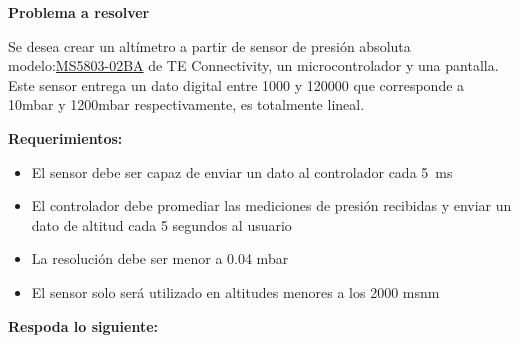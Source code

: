 \documentclass[12pt]{article}
\begin{document}
\setlength{\parindent}{0em}

\noindent\textbf{Problema a resolver}

\vspace{0.5cm}
Se desea crear un altímetro a partir de sensor de presión absoluta modelo:\href{https://www.te.com/commerce/DocumentDelivery/DDEController?Action=srchrtrv&DocNm=MS5803-02BA&DocType=Data+Sheet&DocLang=English}{MS5803-02BA} de TE Connectivity, un microcontrolador y una pantalla. Este sensor entrega un dato digital entre 1000 y 120000 que corresponde a 10mbar y 1200mbar respectivamente, es totalmente lineal. 

\vspace{0.5cm}
\noindent\textbf{Requerimientos:}
\begin{itemize}
    \item El sensor debe ser capaz de enviar un dato al controlador cada \SI{5}{\milli\second}
    \item El controlador debe promediar las mediciones de presión recibidas y enviar un dato de altitud cada 5 segundos al usuario
    \item La resolución debe ser menor a 0.04 \si{\milli bar}
    \item El sensor solo será utilizado en altitudes menores a los 2000 msnm
\end{itemize}

\noindent\textbf{Respoda lo siguiente:}
\end{document}
